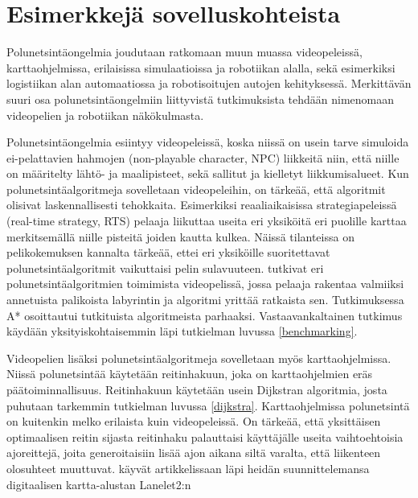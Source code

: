 \section{Esimerkkejä sovelluskohteista}\label{eSuovelluskohteista}
Polunetsintäongelmia joudutaan ratkomaan muun muassa videopeleissä, 
karttaohjelmissa, erilaisissa simulaatioissa ja robotiikan 
alalla\cite{ACMHindawi}, sekä esimerkiksi logistiikan alan automaatiossa ja 
robotisoitujen autojen kehityksessä\cite{arXivMAPF}. Merkittävän suuri 
osa polunetsintäongelmiin liittyvistä tutkimuksista tehdään nimenomaan 
videopelien\cite{MathewAndMalathy}\cite{ACMHindawi}\cite{mazeGameTrilogi}
ja robotiikan\cite{ACMHindawi}\cite{DelaunayVoronoiAStar} näkökulmasta.\par
	Polunetsintäongelmia esiintyy videopeleissä, koska niissä on usein 
tarve simuloida ei-pelattavien hahmojen (non-playable character, NPC) 
liikkeitä niin, että niille on määritelty lähtö- ja maalipisteet, sekä 
sallitut ja kielletyt liikkumisalueet. Kun polunetsintäalgoritmeja 
sovelletaan videopeleihin, on tärkeää, että algoritmit olisivat 
laskennallisesti tehokkaita. Esimerkiksi reaaliaikaisissa strategiapeleissä 
(real-time strategy, RTS) pelaaja liikuttaa useita eri yksiköitä eri puolille 
karttaa merkitsemällä niille pisteitä joiden kautta kulkea. Näissä 
tilanteissa on pelikokemuksen kannalta tärkeää, ettei eri yksiköille 
suoritettavat polunetsintäalgoritmit vaikuttaisi pelin 
sulavuuteen\cite{MathewAndMalathy}. \textcite{mazeGameTrilogi} tutkivat 
eri polunetsintäalgoritmien toimimista videopelissä, jossa pelaaja rakentaa 
valmiiksi annetuista palikoista labyrintin ja algoritmi yrittää ratkaista 
sen. Tutkimuksessa A* osoittautui tutkituista algoritmeista parhaaksi. 
Vastaavankaltainen tutkimus käydään yksityiskohtaisemmin läpi tutkielman 
luvussa \ref{benchmarking}. \par
	Videopelien lisäksi polunetsintäalgoritmeja sovelletaan myös 
karttaohjelmissa. Niissä polunetsintää käytetään reitinhakuun, joka on 
karttaohjelmien eräs päätoiminnallisuus. Reitinhakuun käytetään usein 
Dijkstran algoritmia\cite{IOPDijkstra}, josta puhutaan tarkemmin tutkielman 
luvussa \ref{dijkstra}. Karttaohjelmissa polunetsintä on kuitenkin melko 
erilaista kuin videopeleissä. On tärkeää, että yksittäisen optimaalisen reitin 
sijasta reitinhaku palauttaisi käyttäjälle useita vaihtoehtoisia ajoreittejä, 
joita generoitaisiin lisää ajon aikana siltä varalta, että liikenteen 
olosuhteet muuttuvat\cite{Lanelet2}. \textcite{Lanelet2} käyvät artikkelissaan 
läpi heidän suunnittelemansa digitaalisen kartta-alustan Lanelet2:n 
